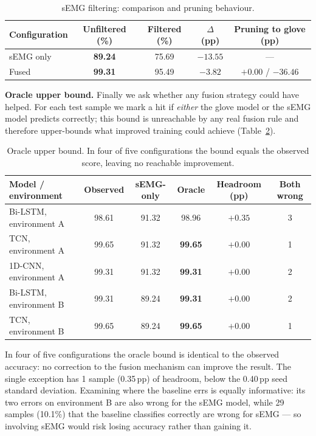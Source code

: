\documentclass[11pt,a4paper]{article}
\begin{document}
\begin{table}[htbp]\centering
\caption{sEMG filtering: comparison and pruning behaviour.}
\label{tab:filter}
\begin{tabular}{lcccc}
\toprule
Configuration & Unfiltered (\%) & Filtered (\%) & $\Delta$ (pp) & Pruning to glove (pp) \\
\midrule
sEMG only & \textbf{89.24} & 75.69 & $-13.55$ & --- \\
Fused & \textbf{99.31} & 95.49 & $-3.82$ & $+0.00$ / $\mathbf{-36.46}$ \\
\bottomrule
\end{tabular}
\end{table}

\textbf{Oracle upper bound.} Finally we ask whether any fusion strategy could have helped. For each test sample we mark a hit if \emph{either} the glove model or the sEMG model predicts correctly; this bound is unreachable by any real fusion rule and therefore upper-bounds what improved training could achieve (Table~\ref{tab:oracle}).

\begin{table}[htbp]\centering
\caption{Oracle upper bound. In four of five configurations the bound equals the observed score, leaving no reachable improvement.}
\label{tab:oracle}
\small
\setlength{\tabcolsep}{4.5pt}
\begin{tabular}{lccccc}
\toprule
Model / environment & Observed & sEMG-only & Oracle & Headroom (pp) & Both wrong \\
\midrule
Bi-LSTM, environment A & 98.61 & 91.32 & 98.96 & $+0.35$ & 3 \\
TCN, environment A & 99.65 & 91.32 & \textbf{99.65} & $\mathbf{+0.00}$ & 1 \\
1D-CNN, environment A & 99.31 & 91.32 & \textbf{99.31} & $\mathbf{+0.00}$ & 2 \\
Bi-LSTM, environment B & 99.31 & 89.24 & \textbf{99.31} & $\mathbf{+0.00}$ & 2 \\
TCN, environment B & 99.65 & 89.24 & \textbf{99.65} & $\mathbf{+0.00}$ & 1 \\
\bottomrule
\end{tabular}
\end{table}

In four of five configurations the oracle bound is identical to the observed accuracy: no correction to the fusion mechanism can improve the result. The single exception has 1 sample (0.35\,pp) of headroom, below the 0.40\,pp seed standard deviation. Examining where the baseline errs is equally informative: its two errors on environment B are also wrong for the sEMG model, while 29 samples (10.1\%) that the baseline classifies correctly are wrong for sEMG --- so involving sEMG would risk losing accuracy rather than gaining it.
\end{document}
